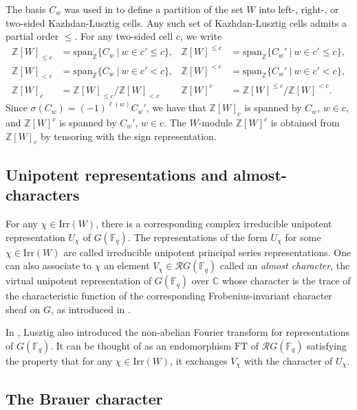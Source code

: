 \documentclass{amsart}
\theoremstyle{definition}
\begin{document}
The basis $C_w$ was used in \cite{KL} to define a partition of the set $W$ into left-, right-, or two-sided Kazhdan-Lusztig cells. Any such set of Kazhdan-Lusztig cells admits a partial order $\leq$. For any two-sided cell $c$, we write
\begin{align*}
    \mathbb{Z}[W]_{\leq c} & = \mathrm{span}_{\mathbb{Z}}\{C_w~|~w \in c'\leq c\},& \mathbb{Z}[W]^{\leq c} & = \mathrm{span}_{\mathbb{Z}}\{C_w'~|~w \in c'\leq c\}, \\
\mathbb{Z}[W]_{< c} & = \mathrm{span}_{\mathbb{Z}}\{C_w~|~w \in c' < c\},& \mathbb{Z}[W]^{< c} & = \mathrm{span}_{\mathbb{Z}}\{C_w'~|~w \in c' < c\}, \\
\mathbb{Z}[W]_c & = \mathbb{Z}[W]_{\leq c}/\mathbb{Z}[W]_{< c} & \mathbb{Z}[W]^c & = \mathbb{Z}[W]^{\leq c}/\mathbb{Z}[W]^{< c}.
\end{align*}
Since $\sigma(C_w) = (-1)^{\ell(w)}C_{w}'$, we have that $\mathbb{Z}[W]_{c}$ is spanned by $C_{w}$, $w \in c$, and $\mathbb{Z}[W]^c$ is spanned by $C_w'$, $w \in c$. The $W$-module $\mathbb{Z}[W]^c$ is obtained from $\mathbb{Z}[W]_c$ by tensoring with the sign representation.

\subsection{Unipotent representations and almost-characters}

For any $\chi \in \mathrm{Irr}(W)$, there is a corresponding complex irreducible unipotent representation $U_{\chi}$ of $G(\mathbb{F}_q)$. The representations of the form $U_{\chi}$ for some $\chi \in \mathrm{Irr}(W)$ are called irreducible unipotent principal series representations. One can also associate to $\chi$ an element $V_\chi \in \mathcal{R}G(\mathbb{F}_q)$ called an \emph{almost character}, the virtual unipotent representation of $G(\mathbb{F}_q)$ over $\mathbb{C}$ whose character is the trace of the characteristic function of the corresponding Frobenius-invariant character sheaf on $G$, as introduced in \cite{LBook}.

In \cite[Section 12.1]{LBook}, Lusztig also introduced the non-abelian Fourier transform for representations of $G(\mathbb{F}_q)$. It can be thought of as an endomorphism $\mathrm{FT}$ of $\mathcal{R}G(\mathbb{F}_q)$ satisfying the property that for any $\chi \in \mathrm{Irr}(W)$, it exchanges $V_{\chi}$ with the character of $U_{\chi}$.

\subsection{The Brauer character}\label{sec:brauer}
\end{document}
